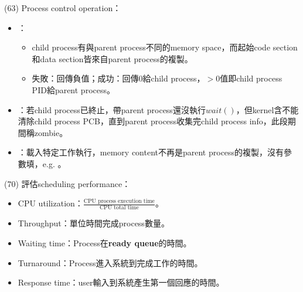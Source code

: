 \begin{theorem}{(63)} Process control operation： \begin{itemize}
        \item {}：\begin{itemize}
            \item child process有與parent process不同的memory space，而起始code section和data section皆來自parent process的複製。
            \item 失敗：回傳負值；成功：回傳$0$給child process，$> 0$值即child process PID給parent process。
        \end{itemize}
        \item {}：若child process已終止，帶parent process還沒執行$wait()$，但kernel含不能清除child process PCB，直到parent process收集完child process info，此段期間稱zombie。
        \item {}：載入特定工作執行，memory content不再是parent process的複製，沒有參數填，e.g. 。
    \end{itemize}
\end{theorem}

\begin{theorem}{(70)} 評估scheduling performance： \begin{itemize}
        \item CPU utilization：$\frac{\text{CPU process execution time}}{\text{CPU total time}}$。
        \item Throughput：單位時間完成process數量。
        \item Waiting time：Process在\textbf{ready queue}的時間。
        \item Turnaround：Process進入系統到完成工作的時間。
        \item Response time：user輸入到系統產生第一個回應的時間。
    \end{itemize}
\end{theorem}

